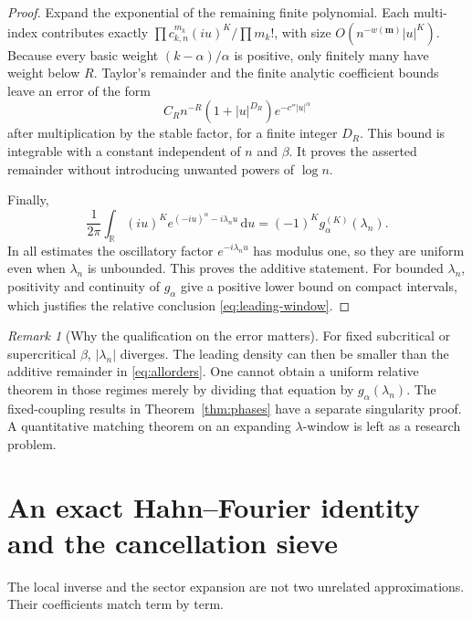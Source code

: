 \documentclass[11pt,a4paper]{article}
\numberwithin{equation}{section}
\theoremstyle{definition}
\theoremstyle{remark}
\newtheorem{remark}[theorem]{Remark}
\newcommand{\R}{\mathbb R}
\newcommand{\dd}{\,\mathrm d}
\newcommand{\m}{\boldsymbol m}
\begin{document}
\begin{proof}
Expand the exponential of the remaining finite polynomial. Each
multi-index contributes exactly
$\prod c_{k,n}^{m_k}(iu)^K/\prod m_k!$, with size
$O(n^{-w(\m)}|u|^K)$. Because every basic weight
$(k-\alpha)/\alpha$ is positive, only finitely many have weight below
$R$. Taylor's remainder and the finite analytic coefficient bounds leave
an error of the form
\[
 C_R n^{-R}(1+|u|^{D_R})e^{-c''|u|^\alpha}
\]
after multiplication by the stable factor, for a finite integer $D_R$.
This bound is integrable with a constant independent of $n$ and $\beta$.
It proves the asserted remainder without introducing unwanted powers of
$\log n$.

Finally,
\[
 \frac1{2\pi}\int_\R(iu)^K
         e^{(-iu)^\alpha-i\lambda_nu}\dd u
       =(-1)^K g_\alpha^{(K)}(\lambda_n).
\]
In all estimates the oscillatory factor $e^{-i\lambda_nu}$ has modulus
one, so they are uniform even when $\lambda_n$ is unbounded. This proves
the additive statement. For bounded $\lambda_n$, positivity and
continuity of $g_\alpha$ give a positive lower bound on compact intervals,
which justifies the relative conclusion \eqref{eq:leading-window}.
\end{proof}

\begin{remark}[Why the qualification on the error matters]
For fixed subcritical or supercritical $\beta$, $|\lambda_n|$ diverges.
The leading density can then be smaller than the additive remainder in
\eqref{eq:allorders}. One cannot obtain a uniform relative theorem in
those regimes merely by dividing that equation by $g_\alpha(\lambda_n)$.
The fixed-coupling results in Theorem~\ref{thm:phases} have a separate
singularity proof. A quantitative matching theorem on an expanding
$\lambda$-window is left as a research problem.
\end{remark}

\section{An exact Hahn--Fourier identity and the cancellation sieve}
\label{sec:duality}

The local inverse and the sector expansion are not two unrelated
approximations. Their coefficients match term by term.
\end{document}
